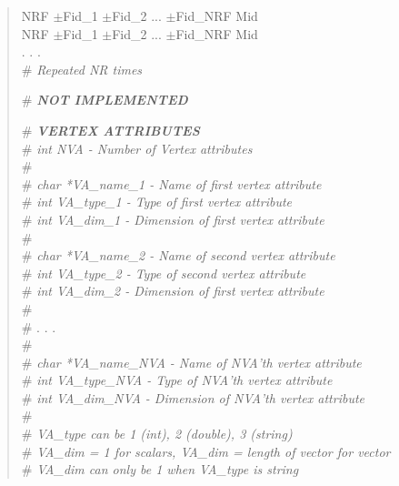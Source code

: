 \documentclass[12pt]{article}
\begin{document}
\begin{verse}
NRF \hspace{0.5ex} $\pm$Fid\_1 \hspace{0.5ex} $\pm$Fid\_2 \hspace{0.5ex} ... \hspace{0.5ex} $\pm$Fid\_NRF \hspace{0.5ex} Mid \\
NRF \hspace{0.5ex} $\pm$Fid\_1 \hspace{0.5ex} $\pm$Fid\_2 \hspace{0.5ex} ... \hspace{0.5ex} $\pm$Fid\_NRF \hspace{0.5ex} Mid \\
. . . \\
\# \textit{Repeated NR times} 
\vspace{2ex}

\# \textit{\textbf{NOT IMPLEMENTED}}

\# \textit{\textbf{VERTEX ATTRIBUTES}} \\
\# \textit{\textit{int} NVA - Number of Vertex attributes} \\
\# \\
\# \textit{char *VA\_name\_1 - Name of first vertex attribute} \\
\# \textit{\textit{int} VA\_type\_1 - Type of first vertex attribute} \\
\# \textit{\textit{int} VA\_dim\_1 - Dimension of first vertex attribute} \\
\# \\
\# \textit{char *VA\_name\_2 - Name of second vertex attribute} \\
\# \textit{\textit{int} VA\_type\_2 - Type of second vertex attribute} \\
\# \textit{\textit{int} VA\_dim\_2 - Dimension of first vertex attribute} \\
\# \\
\# . . .\\
\# \\
\# \textit{char *VA\_name\_NVA - Name of NVA'th vertex attribute} \\
\# \textit{\textit{int} VA\_type\_NVA - Type of NVA'th vertex attribute} \\
\# \textit{\textit{int} VA\_dim\_NVA - Dimension of NVA'th vertex attribute} \\
\# \\
\# \textit{VA\_type can be 1 (int), 2 (double), 3 (string)} \\
\# \textit{VA\_dim = 1 for scalars, VA\_dim = length of vector for vector} \\
\# \textit{VA\_dim can only be 1 when VA\_type is string}
\vspace{1ex}


\end{verse}
\end{document}
